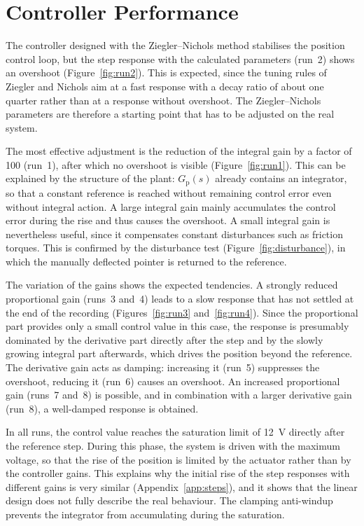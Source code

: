 
\section{Controller Performance}\label{sec:performance}
The controller designed with the Ziegler--Nichols method stabilises the position
control loop, but the step response with the calculated parameters (run~2)
shows an overshoot (Figure~\ref{fig:run2}). This is expected, since the tuning
rules of Ziegler and Nichols aim at a fast response with a decay ratio of about
one quarter rather than at a response without overshoot\autocite{ziegler1942}. The
Ziegler--Nichols parameters are therefore a starting point that has to be
adjusted on the real system.

The most effective adjustment is the reduction of the integral gain by a factor
of 100 (run~1), after which no overshoot is visible (Figure~\ref{fig:run1}). This
can be explained by the structure of the plant: $G_\mathrm{p}(s)$ already
contains an integrator, so that a constant reference is reached without
remaining control error even without integral action. A large integral gain
mainly accumulates the control error during the rise and thus causes the
overshoot. A small integral gain is nevertheless useful, since it compensates
constant disturbances such as friction torques. This is confirmed by the
disturbance test (Figure~\ref{fig:disturbance}), in which the manually deflected
pointer is returned to the reference.

The variation of the gains shows the expected tendencies. A strongly reduced
proportional gain (runs~3 and~4) leads to a slow response that has not settled
at the end of the recording (Figures~\ref{fig:run3} and~\ref{fig:run4}). Since
the proportional part provides only a small control value in this case, the
response is presumably dominated by the derivative part directly after the step
and by the slowly growing integral part afterwards, which drives the position
beyond the reference. The derivative gain acts as damping: increasing it
(run~5) suppresses the overshoot, reducing it (run~6) causes an overshoot. An
increased proportional gain (runs~7 and~8) is possible, and in combination with
a larger derivative gain (run~8), a well-damped response is obtained.

In all runs, the control value reaches the saturation limit of \qty{12}{\volt}
directly after the reference step. During this phase, the system is driven with
the maximum voltage, so that the rise of the position is limited by the
actuator rather than by the controller gains. This explains why the initial rise
of the step responses with different gains is very similar
(Appendix~\ref{app:steps}), and it shows that the linear design does not fully
describe the real behaviour. The clamping anti-windup prevents the integrator
from accumulating during the saturation.

